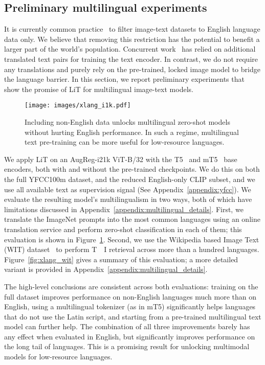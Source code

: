 \documentclass[10pt,twocolumn,letterpaper]{article}
\def \lit {LiT\xspace}
\begin{document}
\subsection{Preliminary multilingual experiments}
\label{sec:multilingual}

It is currently common practice~\cite{align,clip} to filter image-text datasets to English language data only.
We believe that removing this restriction has the potential to benefit a larger part of the world's population.
Concurrent work~\cite{mural} has relied on additional translated text pairs for training the text encoder.
In contrast, we do not require any translations and purely rely on the pre-trained, locked image model to bridge the language barrier.
In this section, we report preliminary experiments that show the promise of \lit for multilingual image-text models.

\begin{figure}[t]
    \centering
    \texttt{[image: images/xlang\_i1k.pdf]}
    \caption{Including non-English data unlocks multilingual zero-shot models without hurting English performance. In such a regime, multilingual text pre-training can be more useful for low-resource languages.}
    \label{fig:xlang_i1k}
\end{figure}

We apply \lit{} on an AugReg-i21k ViT-B/32 with the T5~\cite{T5} and mT5~\cite{mt5} base encoders, both with and without the pre-trained checkpoints. We do this on both the full YFCC100m dataset, and the reduced English-only CLIP subset, and we use all available text as supervision signal (See Appendix~\ref{appendix:yfcc}).
We evaluate the resulting model's multilingualism in two ways, both of which have limitations discussed in Appendix~\ref{appendix:multilingual_details}.
First, we translate the ImageNet prompts into the most common languages using an online translation service and perform zero-shot classification in each of them; this evaluation is shown in Figure~\ref{fig:xlang_i1k}.
Second, we use the Wikipedia based Image Text (WIT) dataset~\cite{wit_dataset} to perform T~~I retrieval across more than a hundred languages. Figure~\ref{fig:xlang_wit} gives a summary of this evaluation; a more detailed variant is provided in Appendix~\ref{appendix:multilingual_details}.

The high-level conclusions are consistent across both evaluations: training on the full dataset improves performance on non-English languages much more than on English, using a multilingual tokenizer (as in mT5) significantly helps languages that do not use the Latin script, and starting from a pre-trained multilingual text model can further help.
The combination of all three improvements barely has any effect when evaluated in English, but significantly improves performance on the long tail of languages.
This is a promising result for unlocking multimodal models for low-resource languages.
\end{document}
